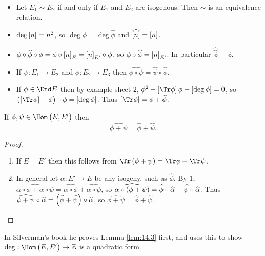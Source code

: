 \begin{remark*}
\hfill
\begin{itemize}
\item Let $ E_1 \sim E_2 $ if and only if $ E_1 $ and $ E_2 $ are isogenous. Then $ \sim $ is an equivalence relation.
\item $ \deg \sbr{n} = n^2 $, so $ \deg \phi = \deg \widehat{\phi} $ and $ \widehat{\sbr{n}} = \sbr{n} $.
\item $ \phi \circ \widehat{\phi} \circ \phi = \phi \circ \sbr{n}_E = \sbr{n}_{E'} \circ \phi $, so $ \phi \circ \widehat{\phi} = \sbr{n}_{E'} $. In particular $ \widehat{\widehat{\phi}} = \phi $.
\item If $ \psi : E_1 \to E_2 $ and $ \phi : E_2 \to E_3 $ then $ \widehat{\phi \circ \psi} = \widehat{\psi} \circ \widehat{\phi} $.
\item If $ \phi \in \End E $ then by example sheet $ 2 $, $ \phi^2 - \sbr{\Tr \phi}\phi + \sbr{\deg \phi} = 0 $, so $ \br{\sbr{\Tr \phi} - \phi} \circ \phi = \sbr{\deg \phi} $. Thus $ \sbr{\Tr \phi} = \phi + \widehat{\phi} $.
\end{itemize}
\end{remark*}

\begin{lemma}
\label{lem:14.3}
If $ \phi, \psi \in \Hom\br{E, E'} $ then
$$ \widehat{\phi + \psi} = \widehat{\phi} + \widehat{\psi}. $$
\end{lemma}

\begin{proof}
\hfill
\begin{enumerate}
\item If $ E = E' $ then this follows from $ \Tr \br{\phi + \psi} = \Tr \phi + \Tr \psi $.
\item In general let $ \alpha : E' \to E $ be any isogeny, such as $ \widehat{\phi} $. By $ 1 $, $ \widehat{\alpha \circ \phi + \alpha \circ \psi} = \widehat{\alpha \circ \phi} + \widehat{\alpha \circ \psi} $, so $ \widehat{\alpha \circ \br{\phi + \psi}} = \widehat{\phi} \circ \widehat{\alpha} + \widehat{\psi} \circ \widehat{\alpha} $. Thus $ \widehat{\phi + \psi} \circ \widehat{\alpha} = \br{\widehat{\phi} + \widehat{\psi}} \circ \widehat{\alpha} $, so $ \widehat{\phi + \psi} = \widehat{\phi} + \widehat{\psi} $.
\end{enumerate}
\end{proof}

\begin{remark*}
In Silverman's book he proves Lemma \ref{lem:14.3} first, and uses this to show $ \deg : \Hom\br{E, E'} \to \ZZ $ is a quadratic form.
\end{remark*}

